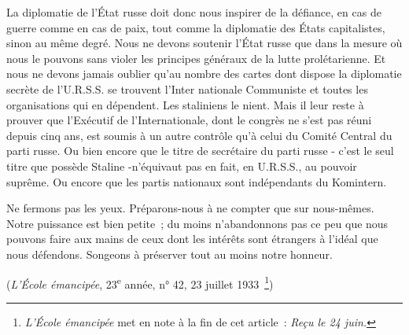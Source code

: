 \documentclass[french,twoside]{book} %
\begin{document}
La diplomatie de l'État russe doit donc nous inspirer de la défiance, en cas de guerre comme en cas de paix, tout comme la diplomatie des États capitalistes, sinon au même degré. Nous ne devons soutenir l'État russe que dans la mesure où nous le pouvons sans violer les principes généraux de la lutte prolétarienne. Et nous ne devons jamais oublier qu'au nombre des cartes dont dispose la diplomatie secrète de l'U.R.S.S. se trouvent l'Inter nationale Communiste et toutes les organisations qui en dépendent. Les staliniens le nient. Mais il leur reste à prouver que l'Exécutif de l'Internationale, dont le congrès ne s'est pas réuni depuis cinq ans, est soumis à un autre contrôle qu'à celui du Comité Central du parti russe. Ou bien encore que le titre de secré­taire du parti russe - c'est le seul titre que possède Staline -n'équivaut pas en fait, en U.R.S.S., au pouvoir suprême. Ou encore que les partis nationaux sont indépendants du Komintern.\par
Ne fermons pas les yeux. Préparons-nous à ne compter que sur nous-mêmes. Notre puissance est bien petite ; du moins n’abandonnons pas ce peu que nous pouvons faire aux mains de ceux dont les intérêts sont étrangers à l'idéal que nous défendons. Songeons à préserver tout au moins notre honneur.\par
({\itshape L'École émancipée}, 23\textsuperscript{e} année, n° 42, 23 juillet 1933 \footnote{{\itshape L'École émancipée} met en note à la fin de cet article : {\itshape Reçu le 24 juin.}})\par
\end{document}
